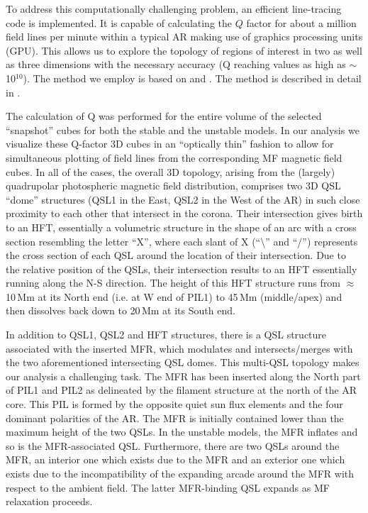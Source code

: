 \documentclass[preprint]{aastex}
\begin{document}
To address this computationally challenging problem, an efficient line-tracing code is implemented. It is capable of calculating the $Q$ factor for about a million field lines per minute within a typical AR making use of graphics processing units (GPU). This allows us to explore the topology of regions of interest in two as well as three dimensions with the necessary accuracy (Q reaching values as high as $\sim$10$^{10}$). The method we employ is based on \citet{titov07} and \citet{pariat12}. The method is described in detail in \cite{Tassev_and_Savcheva_2017}.


The calculation of Q was performed for the entire volume of the selected ``snapshot'' cubes for both the stable and the unstable models. In our analysis we visualize these Q-factor 3D cubes in an ``optically thin'' fashion to allow for simultaneous plotting of field lines from the corresponding MF magnetic field cubes. In all of the cases, the overall 3D topology, arising from the (largely) quadrupolar photospheric magnetic field distribution, comprises two 3D QSL ``dome'' structures (QSL1 in the East, QSL2 in the West of the AR) in such close proximity to each other that intersect in the corona. Their intersection gives birth to an HFT, essentially a volumetric structure in the shape of an arc with a cross section resembling the letter ``X'', where each slant of X (``\textbackslash'' and ``/'') represents the cross section of each QSL around the location of their intersection. Due to the relative position of the QSLs, their intersection results to an HFT essentially running along the N-S direction. The height of this HFT structure runs from $\approx$10\,Mm at its North end (i.e. at W end of PIL1) to 45\,Mm (middle/apex) and then dissolves back down to 20\,Mm at its South end.  

In addition to QSL1, QSL2 and HFT structures, there is a QSL structure associated with the inserted MFR, which modulates and intersects/merges with the two aforementioned intersecting QSL domes. This multi-QSL topology makes our analysis a challenging task. The MFR has been inserted along the North part of PIL1 and PIL2 as delineated by the filament structure at the north of the AR core. This PIL is formed by the opposite quiet sun flux elements and the four dominant polarities of the AR. The MFR is initially contained lower than the maximum height of the two QSLs. In the unstable models, the MFR inflates and so is the MFR-associated QSL. Furthermore, there are two QSLs around the MFR, an interior one which exists due to the MFR and an exterior one which exists due to the incompatibility of the expanding arcade around the MFR with respect to the ambient field. The latter MFR-binding QSL expands as MF relaxation proceeds. 
\end{document}

